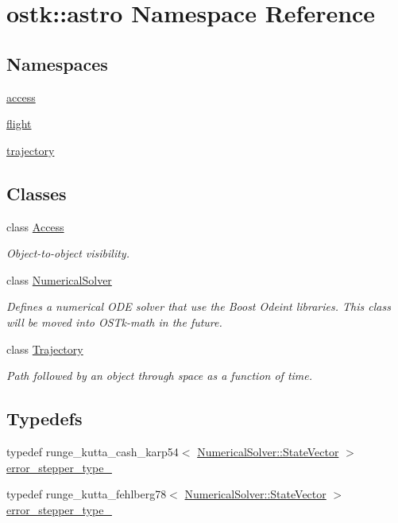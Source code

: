 \hypertarget{namespaceostk_1_1astro}{}\section{ostk\+:\+:astro Namespace Reference}
\label{namespaceostk_1_1astro}
\subsection*{Namespaces}
\begin{DoxyCompactItemize}
\item 
 \hyperlink{namespaceostk_1_1astro_1_1access}{access}
\item 
 \hyperlink{namespaceostk_1_1astro_1_1flight}{flight}
\item 
 \hyperlink{namespaceostk_1_1astro_1_1trajectory}{trajectory}
\end{DoxyCompactItemize}
\subsection*{Classes}
\begin{DoxyCompactItemize}
\item 
class \hyperlink{classostk_1_1astro_1_1_access}{Access}
\begin{DoxyCompactList}\small\item\em Object-\/to-\/object visibility. \end{DoxyCompactList}\item 
class \hyperlink{classostk_1_1astro_1_1_numerical_solver}{Numerical\+Solver}
\begin{DoxyCompactList}\small\item\em Defines a numerical O\+DE solver that use the Boost Odeint libraries. This class will be moved into O\+S\+Tk-\/math in the future. \end{DoxyCompactList}\item 
class \hyperlink{classostk_1_1astro_1_1_trajectory}{Trajectory}
\begin{DoxyCompactList}\small\item\em Path followed by an object through space as a function of time. \end{DoxyCompactList}\end{DoxyCompactItemize}
\subsection*{Typedefs}
\begin{DoxyCompactItemize}
\item 
typedef runge\+\_\+kutta\+\_\+cash\+\_\+karp54$<$ \hyperlink{classostk_1_1astro_1_1_numerical_solver_a4a1673a6f74a72d6bacfe6480b9c1ccd}{Numerical\+Solver\+::\+State\+Vector} $>$ \hyperlink{namespaceostk_1_1astro_ae0e87d949c5bf8265860957bc3e551a4}{error\+\_\+stepper\+\_\+type\+\_}
\item 
typedef runge\+\_\+kutta\+\_\+fehlberg78$<$ \hyperlink{classostk_1_1astro_1_1_numerical_solver_a4a1673a6f74a72d6bacfe6480b9c1ccd}{Numerical\+Solver\+::\+State\+Vector} $>$ \hyperlink{namespaceostk_1_1astro_ac65cff551d02047f499131307bd5f688}{error\+\_\+stepper\+\_\+type\+\_}
\end{DoxyCompactItemize}
